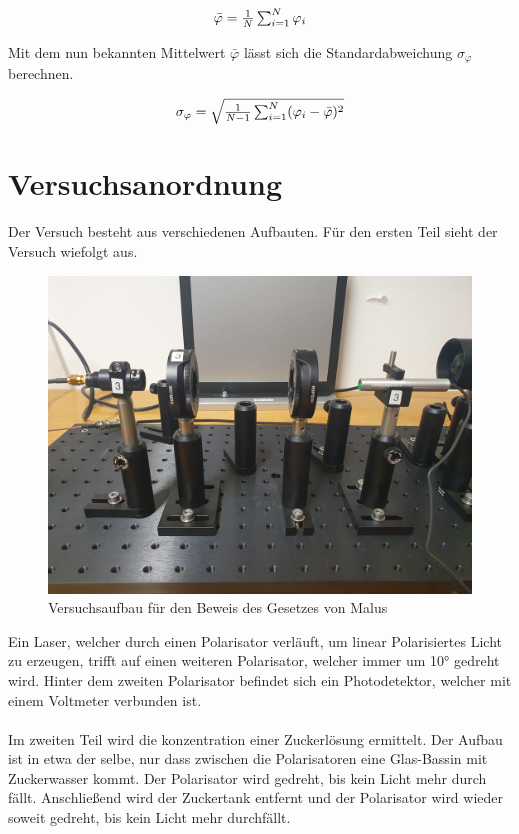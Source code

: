\documentclass[12pt,a4paper,twoside]{article}
\begin{document}
\begin{equation}
    \label{eq:Mittelwert}
    \centerline{$\bar{\varphi} = \frac{1}{N} \sum_{i = 1}^{N} \varphi_i $} 
\end{equation}

\noindent
Mit dem nun bekannten Mittelwert $\bar{\varphi}$ lässt sich die Standardabweichung $\sigma_{\varphi}$ berechnen. 

\begin{equation}
    \label{eq:Standardabweichung}
    \centerline{$\sigma_{\varphi} = \sqrt{\frac{1}{N-1} \sum_{i = 1}^{N} (\varphi_i - \bar{\varphi})^2}$} 
\end{equation}

\section{Versuchsanordnung} %
Der Versuch besteht aus verschiedenen Aufbauten. Für den ersten Teil sieht der Versuch wiefolgt aus. 

    \begin{figure}[H]
        \centering
        \includegraphics[width=0.6\linewidth]{nudes/aufbau mallus.jpg}
        \caption{Versuchsaufbau für den Beweis des Gesetzes von Malus}
        \label{fig:mallus aufbau}
    \end{figure}

\noindent
Ein Laser, welcher durch einen Polarisator verläuft, um linear Polarisiertes Licht zu erzeugen, trifft auf einen weiteren Polarisator, welcher immer um 10° gedreht wird. 
Hinter dem zweiten Polarisator befindet sich ein Photodetektor, welcher mit einem Voltmeter verbunden ist. 
\\
\\
Im zweiten Teil wird die konzentration einer Zuckerlösung ermittelt. Der Aufbau ist in etwa der selbe, nur dass zwischen die Polarisatoren eine Glas-Bassin mit Zuckerwasser kommt. 
Der Polarisator wird gedreht, bis kein Licht mehr durch fällt. Anschließend wird der Zuckertank entfernt und der Polarisator wird wieder soweit gedreht, bis kein Licht mehr durchfällt. 
\end{document}
